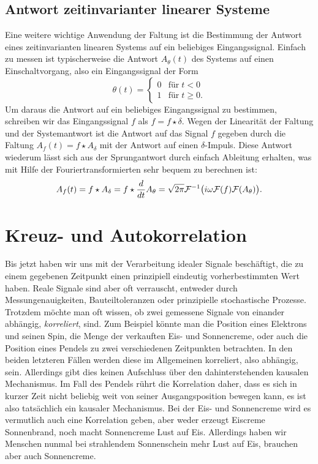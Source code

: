 \subsection{Antwort zeitinvarianter linearer Systeme}

Eine weitere wichtige Anwendung der Faltung ist die Bestimmung der
Antwort eines zeitinvarianten linearen Systems auf ein beliebiges
Eingangssignal. Einfach zu messen ist typischerweise die Antwort
$A_\theta(t)$ des Systems auf einen Einschaltvorgang, also ein
Eingangssignal der Form
\begin{equation}
  \theta(t) =
  \begin{cases}
    0 & \text{für}\; t < 0\\
    1 & \text{für}\; t \ge 0.
  \end{cases}
\end{equation}
Um daraus die Antwort auf ein beliebiges Eingangssignal zu bestimmen,
schreiben wir das Eingangssignal $f$ als $f = f \star \delta$. Wegen
der Linearität der Faltung und der Systemantwort ist die Antwort auf
das Signal $f$ gegeben durch die Faltung $A_f(t) = f \star A_\delta$
mit der Antwort auf einen $\delta$-Impuls. Diese Antwort wiederum
lässt sich aus der Sprungantwort durch einfach Ableitung erhalten, was
mit Hilfe der Fouriertransformierten sehr bequem zu berechnen ist:
\begin{equation}
  A_f(t) = f \star A_\delta = f \star
  \frac{d}{dt} A_\theta = \sqrt{2\pi} \mathcal F^{-1}\bigl( i\omega \mathcal F(f) \mathcal F(A_\theta)\bigr).
\end{equation}

\section{Kreuz- und Autokorrelation}

Bis jetzt haben wir uns mit der Verarbeitung idealer Signale
beschäftigt, die zu einem gegebenen Zeitpunkt einen prinzipiell
eindeutig vorherbestimmten Wert haben.  Reale Signale sind aber oft
verrauscht, entweder durch Messungenauigkeiten, Bauteiltoleranzen oder
prinzipielle stochastische Prozesse.  Trotzdem möchte man oft wissen,
ob zwei gemessene Signale von einander abhängig, \emph{korreliert},
sind. Zum Beispiel könnte man die Position eines Elektrons und seinen
Spin, die Menge der verkauften Eis- und Sonnencreme, oder auch die
Position eines Pendels zu zwei verschiedenen Zeitpunkten betrachten.
In den beiden letzteren Fällen werden diese im Allgemeinen korreliert,
also abhängig, sein. Allerdings gibt dies keinen Aufschluss über den
dahinterstehenden kausalen Mechanismus. Im Fall des Pendels rührt die
Korrelation daher, dass es sich in kurzer Zeit nicht beliebig weit von
seiner Ausgangsposition bewegen kann, es ist also tatsächlich ein kausaler
Mechanismus. Bei der Eis- und Sonnencreme wird es vermutlich auch eine
Korrelation geben, aber weder erzeugt Eiscreme Sonnenbrand, noch macht
Sonnencreme Lust auf Eis. Allerdings haben wir Menschen nunmal bei
strahlendem Sonnenschein mehr Lust auf Eis, brauchen aber auch Sonnencreme.

